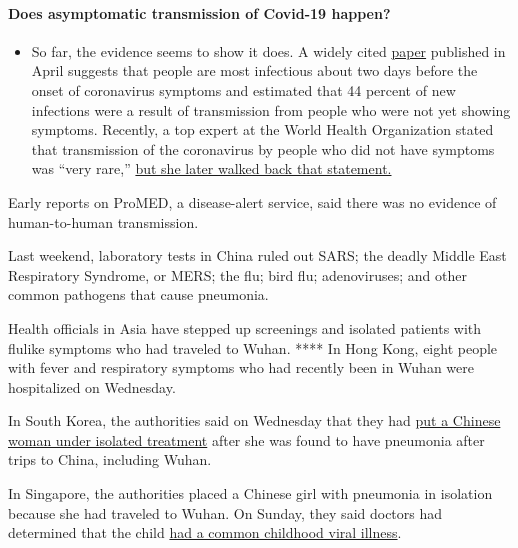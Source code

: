 \begin{itemize}
{  \paragraph{Does asymptomatic transmission of Covid-19
  happen?}\label{does-asymptomatic-transmission-of-covid-19-happen}}

  \begin{itemize}
  \tightlist
  \item
    So far, the evidence seems to show it does. A widely cited
    \href{https://www.nature.com/articles/s41591-020-0869-5}{paper}
    published in April suggests that people are most infectious about
    two days before the onset of coronavirus symptoms and estimated that
    44 percent of new infections were a result of transmission from
    people who were not yet showing symptoms. Recently, a top expert at
    the World Health Organization stated that transmission of the
    coronavirus by people who did not have symptoms was ``very rare,''
    \href{https://www.nytimes.com/2020/06/09/world/coronavirus-updates.html?action=click\&pgtype=Article\&state=default\&region=MAIN_CONTENT_3\&context=storylines_faq\#link-1f302e21}{but
    she later walked back that statement.}
  \end{itemize}
\end{itemize}

Early reports on ProMED, a disease-alert service, said there was no
evidence of human-to-human transmission.

Last weekend, laboratory tests in China ruled out SARS; the deadly
Middle East Respiratory Syndrome, or MERS; the flu; bird flu;
adenoviruses; and other common pathogens that cause pneumonia.

Health officials in Asia have stepped up screenings and isolated
patients with flulike symptoms who had traveled to Wuhan. **** In Hong
Kong, eight people with fever and respiratory symptoms who had recently
been in Wuhan were hospitalized on Wednesday.

In South Korea, the authorities said on Wednesday that they had
\href{https://www.scmp.com/news/asia/east-asia/article/3045249/chinese-worker-who-visited-wuhan-quarantined-south-korea}{put
a Chinese woman under isolated treatment} after she was found to have
pneumonia after trips to China, including Wuhan.

In Singapore, the authorities placed a Chinese girl with pneumonia in
isolation because she had traveled to Wuhan. On Sunday, they said
doctors had determined that the child
\href{https://www.moh.gov.sg/news-highlights/details/update-on-local-situation-regarding-severe-pneumonia-cluster-in-wuhan-5-jan}{had
a common childhood viral illness}.

